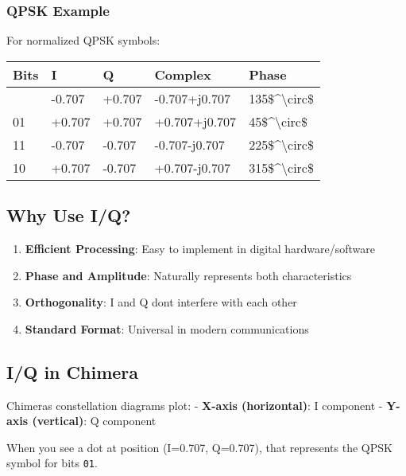 \subsubsection{QPSK Example}\label{qpsk-example}

For normalized QPSK symbols:

{\def\LTcaptype{} %
\begin{longtable}[]{@{}lllll@{}}
\toprule\noalign{}
Bits & I & Q & Complex & Phase \\
\midrule\noalign{}
\endhead
\bottomrule\noalign{}
\endlastfoot
00 & -0.707 & +0.707 & -0.707+j0.707 & 135\$\^{}\textbackslash circ\$ \\
01 & +0.707 & +0.707 & +0.707+j0.707 & 45\$\^{}\textbackslash circ\$ \\
11 & -0.707 & -0.707 & -0.707-j0.707 & 225\$\^{}\textbackslash circ\$ \\
10 & +0.707 & -0.707 & +0.707-j0.707 & 315\$\^{}\textbackslash circ\$ \\
\end{longtable}
}

\subsection{Why Use I/Q?}\label{why-use-iq}

\begin{enumerate}
\def\labelenumi{\arabic{enumi}.}
\tightlist
\item
  \textbf{Efficient Processing}: Easy to implement in digital
  hardware/software
\item
  \textbf{Phase and Amplitude}: Naturally represents both
  characteristics
\item
  \textbf{Orthogonality}: I and Q don\textquotesingle t interfere with
  each other
\item
  \textbf{Standard Format}: Universal in modern communications
\end{enumerate}

\subsection{I/Q in Chimera}\label{iq-in-chimera}

Chimera\textquotesingle s constellation diagrams plot: - \textbf{X-axis
(horizontal)}: I component - \textbf{Y-axis (vertical)}: Q component

When you see a dot at position (I=0.707, Q=0.707), that represents the
QPSK symbol for bits \texttt{01}.

